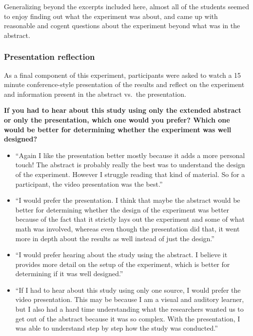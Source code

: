 \documentclass[runningheads
]{llncs}
\providecommand{\tightlist}{%
  \setlength{\itemsep}{0pt}\setlength{\parskip}{0pt}}\usepackage{longtable,booktabs,array}
\begin{document}
Generalizing beyond the excerpts included here, almost all of the
students seemed to enjoy finding out what the experiment was about, and
came up with reasonable and cogent questions about the experiment beyond
what was in the abstract.

\hypertarget{presentation-reflection}{%
\subsubsection{Presentation reflection}\label{presentation-reflection}}

As a final component of this experiment, participants were asked to
watch a 15 minute conference-style presentation of the results and
reflect on the experiment and information present in the abstract
vs.~the presentation.

\textbf{If you had to hear about this study using only the extended
abstract or only the presentation, which one would you prefer? Which one
would be better for determining whether the experiment was well
designed?}

\begin{itemize}
\tightlist
\item
  ``Again I like the presentation better mostly because it adds a more
  personal touch! The abstract is probably really the best was to
  understand the design of the experiment. However I struggle reading
  that kind of material. So for a participant, the video presentation
  was the best.''
\item
  ``I would prefer the presentation. I think that maybe the abstract
  would be better for determining whether the design of the experiment
  was better because of the fact that it strictly lays out the
  experiment and some of what math was involved, whereas even though the
  presentation did that, it went more in depth about the results as well
  instead of just the design.''
\item
  ``I would prefer hearing about the study using the abstract. I believe
  it provides more detail on the setup of the experiment, which is
  better for determining if it was well designed.''
\item
  ``If I had to hear about this study using only one source, I would
  prefer the video presentation. This may be because I am a visual and
  auditory learner, but I also had a hard time understanding what the
  researchers wanted us to get out of the abstract because it was so
  complex. With the presentation, I was able to understand step by step
  how the study was conducted.''
\end{itemize}
\end{document}
